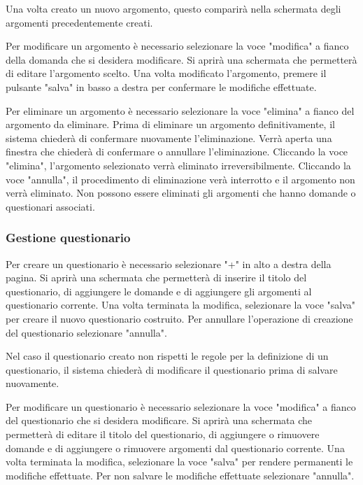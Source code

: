 \documentclass[12pt,a4paper]{article}
\begin{document}
		Una volta creato un nuovo argomento, questo comparirà nella schermata degli argomenti precedentemente creati.
		
		Per modificare un argomento è necessario selezionare la voce "modifica" a fianco della domanda che si desidera modificare. Si aprirà una schermata che permetterà di editare l'argomento scelto.
		Una volta modificato l'argomento, premere il pulsante "salva" in basso a destra per confermare le modifiche effettuate. 
		
		Per eliminare un argomento è necessario selezionare la voce "elimina" a fianco del argomento da eliminare. Prima di eliminare un argomento definitivamente, il sistema chiederà di confermare nuovamente l'eliminazione.
		Verrà aperta una finestra che chiederà di confermare o annullare l'eliminazione. Cliccando la voce "elimina", l'argomento selezionato verrà eliminato irreversibilmente. Cliccando la voce "annulla", il procedimento di eliminazione verà interrotto e il argomento non verrà eliminato.
		Non possono essere eliminati gli argomenti che hanno domande o questionari associati.
		
		\subsubsection{Gestione questionario}
		Per creare un questionario è necessario selezionare "+" in alto a destra della pagina. Si aprirà una schermata che permetterà di inserire il titolo del questionario, di aggiungere le domande e di aggiungere gli argomenti al questionario corrente.
		Una volta terminata la modifica, selezionare la voce "salva" per creare il nuovo questionario costruito. 
		Per annullare l'operazione di creazione del questionario selezionare "annulla".
		
		Nel caso il questionario creato non rispetti le regole per la definizione di un questionario, il sistema chiederà di modificare il questionario prima di salvare nuovamente.
		
		Per modificare un questionario è necessario selezionare la voce "modifica" a fianco del questionario che si desidera modificare. Si aprirà una schermata che permetterà di editare il titolo del questionario, di aggiungere o rimuovere domande e di aggiungere o rimuovere argomenti dal questionario corrente.
		Una volta terminata la modifica, selezionare la voce "salva" per rendere permanenti le modifiche effettuate. Per non salvare le modifiche effettuate selezionare "annulla".
			
\end{document}
